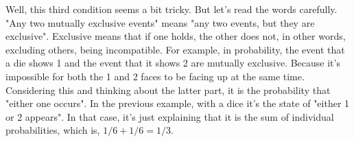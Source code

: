 \documentclass{ltjbook}
\begin{document}
Well, this third condition seems a bit tricky. But let's read the words carefully. "Any two mutually exclusive events" means "any two events, but they are exclusive". Exclusive means that if one holds, the other does not, in other words, excluding others, being incompatible. For example, in probability, the event that a die shows 1 and the event that it shows 2 are mutually exclusive. Because it's impossible for both the 1 and 2 faces to be facing up at the same time. Considering this and thinking about the latter part, it is the probability that "either one occurs". In the previous example, with a dice it's the state of "either 1 or 2 appears". In that case, it's just explaining that it is the sum of individual probabilities, which is, $1/6+1/6=1/3$.
\end{document}
